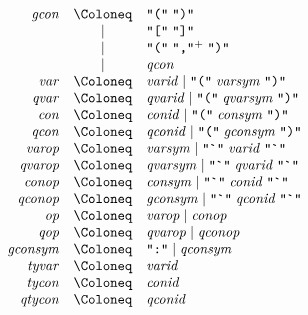 \begin{align*}
  \begin{array}{rcl}
    \mathit{gcon}
    & \Coloneq & \text{\texttt{\textquotedbl(\textquotedbl}}\; \text{\texttt{\textquotedbl)\textquotedbl}} \\
    & \mid & \text{\texttt{\textquotedbl[\textquotedbl}}\; \text{\texttt{\textquotedbl]\textquotedbl}} \\
    & \mid & \text{\texttt{\textquotedbl(\textquotedbl}}\; \text{\texttt{\textquotedbl,\textquotedbl}}^+\; \text{\texttt{\textquotedbl)\textquotedbl}} \\
    & \mid & \mathit{qcon} \\
    \mathit{var}
    & \Coloneq & \mathit{varid} \mid \text{\texttt{\textquotedbl(\textquotedbl}}\; \mathit{varsym}\; \text{\texttt{\textquotedbl)\textquotedbl}} \\
    \mathit{qvar}
    & \Coloneq & \mathit{qvarid} \mid \text{\texttt{\textquotedbl(\textquotedbl}}\; \mathit{qvarsym}\; \text{\texttt{\textquotedbl)\textquotedbl}} \\
    \mathit{con}
    & \Coloneq & \mathit{conid} \mid \text{\texttt{\textquotedbl(\textquotedbl}}\; \mathit{consym}\; \text{\texttt{\textquotedbl)\textquotedbl}} \\
    \mathit{qcon}
    & \Coloneq & \mathit{qconid} \mid \text{\texttt{\textquotedbl(\textquotedbl}}\; \mathit{gconsym}\; \text{\texttt{\textquotedbl)\textquotedbl}} \\
    \mathit{varop}
    & \Coloneq & \mathit{varsym} \mid \text{\texttt{\textquotedbl\textasciigrave\textquotedbl}}\; \mathit{varid}\; \text{\texttt{\textquotedbl\textasciigrave\textquotedbl}} \\
    \mathit{qvarop}
    & \Coloneq & \mathit{qvarsym} \mid \text{\texttt{\textquotedbl\textasciigrave\textquotedbl}}\; \mathit{qvarid}\; \text{\texttt{\textquotedbl\textasciigrave\textquotedbl}} \\
    \mathit{conop}
    & \Coloneq & \mathit{consym} \mid \text{\texttt{\textquotedbl\textasciigrave\textquotedbl}}\; \mathit{conid}\; \text{\texttt{\textquotedbl\textasciigrave\textquotedbl}} \\
    \mathit{qconop}
    & \Coloneq & \mathit{gconsym} \mid \text{\texttt{\textquotedbl\textasciigrave\textquotedbl}}\; \mathit{qconid}\; \text{\texttt{\textquotedbl\textasciigrave\textquotedbl}} \\
    \mathit{op}
    & \Coloneq & \mathit{varop} \mid \mathit{conop} \\
    \mathit{qop}
    & \Coloneq & \mathit{qvarop} \mid \mathit{qconop} \\
    \mathit{gconsym}
    & \Coloneq & \text{\texttt{\textquotedbl :\textquotedbl}} \mid \mathit{qconsym} \\
    \mathit{tyvar}
    & \Coloneq & \mathit{varid} \\
    \mathit{tycon}
    & \Coloneq & \mathit{conid} \\
    \mathit{qtycon}
    & \Coloneq & \mathit{qconid}
  \end{array}
\end{align*}

